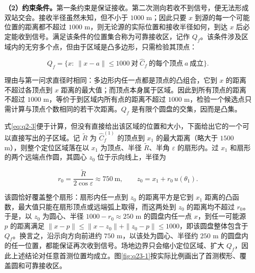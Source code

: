 \textbf{（2）约束条件。}第一条约束是保证接收。第二次测向若收不到信号，便无法形成双站交会。接收半径虽然未知，但不小于 $1000$ m；因此只要 $x$ 到源的每一个可能位置的距离都不超过 $1000$ m，则无论源的实际位置和接收半径如何，到达 $x$ 后必定能收到信号。满足该条件的位置集合称为可靠接收区，记作 $Q_f$。该条件涉及区域内的无穷多个点，但由于区域是凸多边形，只需检验其顶点：

\begin{equation}\label{eq:q2-3}
Q_f=\bigl\{x:\ \|x-a\|\le1000\ \text{对}\ \widehat C_f\ \text{的每个顶点}\ a\ \text{成立}\bigr\}.
\end{equation}

理由与第一问求直径时相同：多边形内任一点都是顶点的凸组合，它到 $x$ 的距离不超过各顶点到 $x$ 距离的最大值；而顶点本身属于区域。因此到所有顶点的距离不超过 $1000$ m，等价于到区域内所有点的距离不超过 $1000$ m，检验一个候选点只需计算与顶点个数相同的若干次距离。$Q_f$ 是有限个圆盘的交集，因而是凸集。

式\eqref{eq:q2-3}便于计算，但没有直接给出该区域的位置和大小，下面给出它的一个可以直接写出的子区域。记 $\widetilde R$ 为 $\widehat C_f^{(1)}$ 的顶点到 $x_1$ 的最大距离（略大于 $1500$ m），则整个定位区域落在以 $x_1$ 为顶点、半径 $\widetilde R$、半角 $\varepsilon$ 的扇形内。过 $x_1$ 和扇形的两个远端点作圆，其圆心 $z_0$ 位于示向线上，半径为

\begin{equation}\label{eq:q2-4}
r_0=\frac{\widetilde R}{2\cos\varepsilon}\approx750\ \text{m},\qquad z_0=x_1+r_0\,u(\theta_1).
\end{equation}

该圆恰好覆盖整个扇形：扇形内任一点到 $z_0$ 的距离平方是它到 $x_1$ 距离的凸函数，最大值只能在扇形顶点或远端弧上取得，而这两处到 $z_0$ 的距离均不超过 $r_0$。于是，以 $z_0$ 为圆心、半径 $1000-r_0\approx250$ m 的圆盘内任一点 $x$，到任一可能源 $p$ 的距离满足 $\|x-p\|\le\|x-z_0\|+\|z_0-p\|\le1000$，即该圆盘整体包含于 $Q_f$。换言之，沿示向方向前进约 $750$ m，以该处为圆心、半径约 $250$ m 的圆盘内的任一位置，都能保证再次收到信号。场地边界只会缩小定位区域、扩大 $Q_f$，因此上述结论对任意首测位置均成立。图\ref{fig:q23-1}按实际比例画出了首测楔形、覆盖圆和可靠接收区。

\begin{center}
\begin{minipage}{\linewidth}
\centering
\QTwoRegionFigure
{}
\label{fig:q23-1}
\end{minipage}
\end{center}

